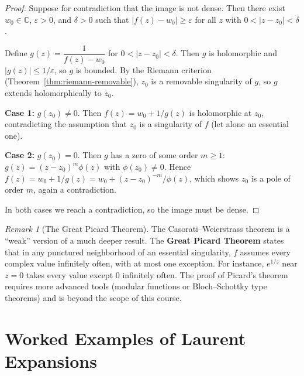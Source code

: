 \documentclass[12pt,a4paper,openany]{book}
\theoremstyle{definition}
\theoremstyle{plain}
\theoremstyle{remark}
\newtheorem{remark}[definition]{Remark}
\newcommand{\C}{\mathbb{C}}
\newcommand{\abs}[1]{\left|#1\right|}
\begin{document}
\begin{proof}
Suppose for contradiction that the image is not dense. Then there exist $w_0\in\C$,
$\varepsilon>0$, and $\delta>0$ such that $\abs{f(z)-w_0}\ge\varepsilon$ for all
$z$ with $0<\abs{z-z_0}<\delta$.

Define $g(z)=\dfrac{1}{f(z)-w_0}$ for $0<\abs{z-z_0}<\delta$. Then $g$ is
holomorphic and $\abs{g(z)}\le 1/\varepsilon$, so $g$ is bounded. By the Riemann
criterion (Theorem~\ref{thm:riemann-removable}), $z_0$ is a removable singularity
of $g$, so $g$ extends holomorphically to $z_0$.

\medskip\noindent
\textbf{Case 1:} $g(z_0)\ne 0$. Then $f(z)=w_0+1/g(z)$ is holomorphic at $z_0$,
contradicting the assumption that $z_0$ is a singularity of $f$ (let alone an
essential one).

\medskip\noindent
\textbf{Case 2:} $g(z_0)=0$. Then $g$ has a zero of some order $m\ge 1$:
$g(z)=(z-z_0)^m\phi(z)$ with $\phi(z_0)\ne 0$. Hence
$f(z)=w_0+1/g(z)=w_0+(z-z_0)^{-m}/\phi(z)$, which shows $z_0$ is a pole of
order $m$, again a contradiction.

In both cases we reach a contradiction, so the image must be dense.
\end{proof}

\begin{remark}[The Great Picard Theorem]\label{rem:picard}
The Casorati--Weierstrass theorem is a ``weak'' version of a much deeper result.
The \textbf{Great Picard Theorem} states that in any punctured neighborhood of an
essential singularity, $f$ assumes every complex value infinitely often, with at
most one exception. For instance, $e^{1/z}$ near $z=0$ takes every value except
$0$ infinitely often. The proof of Picard's theorem requires more advanced tools
(modular functions or Bloch--Schottky type theorems) and is beyond the scope of
this course.
\end{remark}

\section{Worked Examples of Laurent Expansions}
\label{sec:laurent-examples}
\end{document}
